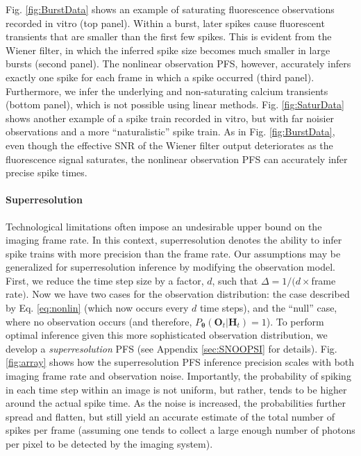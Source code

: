 \documentclass[10pt]{article}
\providecommand{\ve}[1]{\boldsymbol{#1}}
\providecommand{\ve}[1]{\boldsymbol{#1}}
\newcommand{\thetn}{\ve{\theta}}
\newcommand{\p}{P_{\thetn}}
\begin{document}
Fig. \ref{fig:BurstData} shows an example of saturating fluorescence observations recorded in vitro (top panel).  Within a burst, later spikes cause fluorescent transients that are smaller than the first few spikes.  This is evident from the Wiener filter, in which the inferred spike size becomes much smaller in large bursts (second panel).  The nonlinear observation PFS, however, accurately infers exactly one spike for each frame in which a spike occurred (third panel). Furthermore, we infer the underlying and non-saturating calcium transients (bottom panel), which is not possible using linear methods.  Fig. \ref{fig:SaturData} shows another example of a spike train recorded in vitro, but with far noisier observations and a more ``naturalistic'' spike train. As in Fig. \ref{fig:BurstData}, even though the effective SNR of the Wiener filter output deteriorates as the fluorescence signal saturates, the nonlinear observation PFS can accurately infer precise spike times.


\paragraph{Superresolution}

Technological limitations often impose an undesirable upper bound on the imaging frame rate.  In this context, superresolution denotes the ability to infer spike trains with more precision than the frame rate. Our assumptions may be generalized for superresolution inference by modifying the observation model. First, we reduce the time step size by a factor, $d$, such that $\Delta=1/(d \times$frame rate$)$.  Now we have two cases for the observation distribution: the case described by Eq. \ref{eq:nonlin} (which now occurs every $d$ time steps), and the ``null'' case, where  no observation occurs (and therefore, $\p(\ve{O}_t | \ve{H}_t)=1$). To perform optimal inference given this more sophisticated observation distribution, we develop a \emph{superresolution} PFS (see Appendix \ref{sec:SNOOPSI} for details).  Fig. \ref{fig:array} shows how the superresolution PFS inference precision scales with both imaging frame rate and observation noise. Importantly, the probability of spiking in each time step within an image is not uniform, but rather, tends to be higher around the actual spike time. As the noise is increased, the probabilities further spread and flatten, but still yield an accurate estimate of the total number of spikes per frame (assuming one tends to collect a large enough number of photons per pixel to be detected by the imaging system).  
\end{document}
